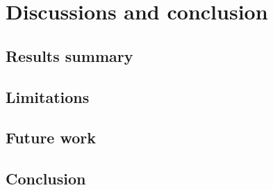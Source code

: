 \documentclass[a4paper,11pt]{kth-mag}
\begin{document}
\chapter{Discussions and conclusion}

\section{Results summary}

\section{Limitations}

\section{Future work}

\section{Conclusion}


\nocite{mythos}
\nocite{euregulation}
\nocite{healthcare}
\nocite{trust}
\nocite{explainingclassif}
\nocite{evolutionnary}
\nocite{breastcancer}
\nocite{sensitivity}

\printbibliography
\end{document}
